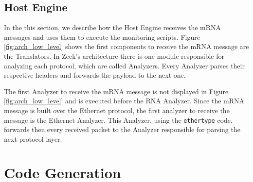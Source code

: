 \subsection{Host Engine}

In the this section, we describe how the Host Engine receives the mRNA messages and uses them to execute the monitoring scripts. Figure \ref{fig:arch_low_level} shows the first components to receive the mRNA message are the Translators. In Zeek's architecture there is one module responsible for analyzing each protocol, which are called Analyzers. Every Analyzer parses their respective headers and forwards the payload to the next one.

The first Analyzer to receive the mRNA message is not displayed in Figure \ref{fig:arch_low_level} and is executed before the RNA Analyzer. Since the mRNA message is built over the Ethernet protocol, the first analyzer to receive the message is the Ethernet Analyzer. This Analyzer, using the \texttt{ethertype} code, forwards then every received packet to the Analyzer responsible for parsing the next protocol layer.




\section{Code Generation}

